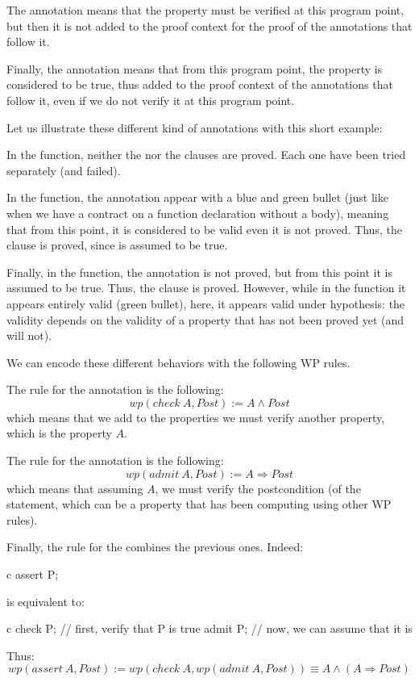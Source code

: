 The annotation  means that the property  must
be verified at this program point, but then it is not added to the proof context
for the proof of the annotations that follow it.


Finally, the annotation  means that from this program point,
the property  is considered to be true, thus added to the proof
context of the annotations that follow it, even if we do not verify it at this
program point.


Let us illustrate these different kind of annotations with this short example:






In the  function, neither the  nor
the  clauses are proved. Each one have been tried separately
(and failed).


In the  function, the  annotation
appear with a blue and green bullet (just like when we have a contract on a
function declaration without a body), meaning that from this point, it is
considered to be valid even it is not proved. Thus, the 
clause is proved, since  is assumed to be
true.


Finally, in the  function, the 
annotation is not proved, but from this point it is assumed to be true. Thus,
the  clause is proved. However, while in the
 function it appears entirely valid (green bullet),
here, it appears valid under hypothesis: the validity depends on the validity
of a property that has not been proved yet (and will not).


We can encode these different behaviors with the following WP rules.


The rule for the  annotation is the following:
$$ wp(check\ A, Post) := A \wedge Post $$
which means that we add to the properties we must verify another property, which
is the property $A$.


The rule for the  annotation is the following:
$$ wp(admit\ A, Post) := A \Rightarrow Post $$
which means that assuming $A$, we must verify the postcondition (of the
statement, which can be a property that has been computing using other WP
rules).


Finally, the rule for the  combines the previous ones.
Indeed:
\begin{CodeBlock}{c}
  assert P;
\end{CodeBlock}
is equivalent to:
\begin{CodeBlock}{c}
  check P; // first, verify that P is true
  admit P; // now, we can assume that it is
\end{CodeBlock}
Thus:
$$ wp(assert\ A, Post) := wp(check\ A, wp(admit\ A, Post)) \equiv A \wedge (A \Rightarrow Post) $$


